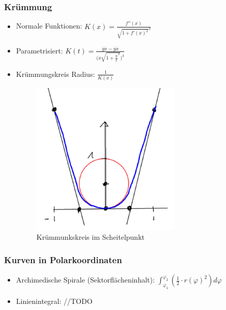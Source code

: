 \subsubsection{Krümmung}
\begin{itemize}
	\item Normale Funktionen: $K(x) = \frac{f''(x)}{\sqrt{1+f'(x)^2}^3}$
	\item Parametrisiert: 
	$K(t) = \frac
		{\ddot{y} \dot{x} - \dot{y} \ddot{x}}
		{\big ( \dot{x} \sqrt{1 + \frac{ \dot{y} }{ \dot{x} }^2} \big )^3}
	$
	\item Krümmungskreis Radius: $\frac{1}{K(x)}$ \\
	\begin{figure}[h!]
		\centering
		\includegraphics[scale=.5]{pics/kruemmungskreis}
		\caption{Krümmunkskreis im Scheitelpunkt}
	\end{figure}
\end{itemize}

\subsubsection{Kurven in Polarkoordinaten}
\begin{itemize}
	\item Archimedische Spirale (Sektorflächeninhalt):
	$\int_{\varphi_1}^{\varphi_2} (\frac{1}{2}\cdot r(\varphi )^2) d\varphi$
	\item Linienintegral:
	//TODO
\end{itemize}
